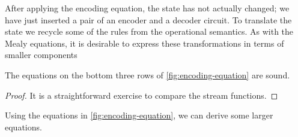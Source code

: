 

After applying the encoding equation, the state has not actually changed; we
have just inserted a pair of an encoder and a decoder circuit.
To translate the state we recycle some of the rules from the operational
semantics.
As with the Mealy equations, it is desirable to express these transformations in
terms of smaller components

\begin{lemma}
    The equations on the bottom three rows of \cref{fig:encoding-equation} are
    sound.
\end{lemma}
\begin{proof}
    It is a straightforward exercise to compare the stream functions.
\end{proof}

Using the equations in \cref{fig:encoding-equation}, we can derive some larger
equations.

